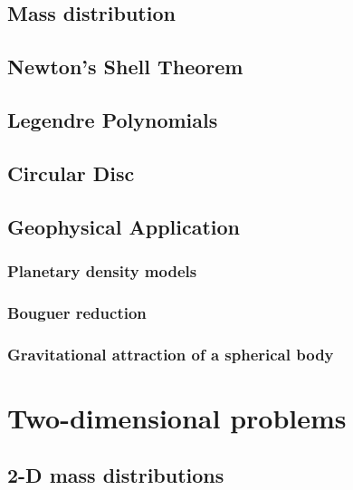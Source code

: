 \documentclass[
  a4paper,
  DIV=11,
  numbers=noendperiod]{scrreprt}
\begin{document}
\chapter{Mass distribution}\label{mass-distribution}

\chapter{Newton's Shell Theorem}\label{newtons-shell-theorem}

\chapter{Legendre Polynomials}\label{legendre-polynomials}

\chapter{Circular Disc}\label{circular-disc}

\chapter{Geophysical Application}\label{geophysical-application}

\section{Planetary density models}\label{planetary-density-models}

\section{Bouguer reduction}\label{bouguer-reduction}

\section{Gravitational attraction of a spherical
body}\label{gravitational-attraction-of-a-spherical-body}

\part{Two-dimensional problems}

\chapter{2-D mass distributions}\label{d-mass-distributions}
\end{document}
